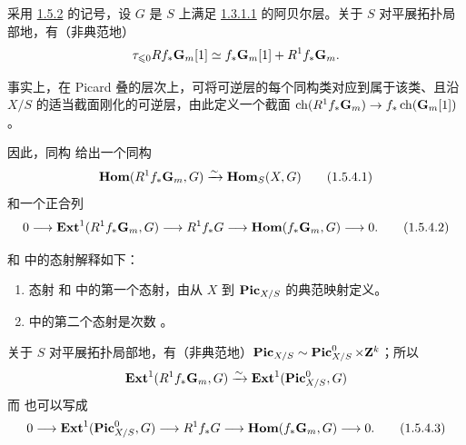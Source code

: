 \subsubsection{}
采用 \hyperref[XVIII.thm1.5.2]{1.5.2} 的记号，设 $G$ 是 $S$ 上满足 \hyperref[XVIII.par1.3.1.1]{1.3.1.1} 的阿贝尔层。关于 $S$ 对平展拓扑局部地，有（非典范地）
$$
\tau_{\leqslant 0}
Rf_{\ast}\mathbf{G}_{m}[1]\simeq
f_{\ast}\mathbf{G}_{m}[1]+R^{1}f_{\ast}\mathbf{G}_{m}{}.
$$

事实上，在 Picard 叠的层次上，可将可逆层的每个同构类对应到属于该类、且沿 $X/S$ 的适当截面刚化的可逆层，由此定义一个截面 $\operatorname{ch}(R^{1}f_{\ast}\mathbf{G}_{m})\rightarrow f_{\ast}\operatorname{ch}(\mathbf{G}_{m}[1])$。

因此，同构  给出一个同构
\begin{equation*}
\operatorname{\mathbf{Hom}}(R^{1}f_{\ast}\mathbf{G}_{m},G)\xrightarrow{\sim}\operatorname{\mathbf{Hom}}_{S}(X,G){}\tag{1.5.4.1}
\end{equation*}%
和一个正合列
\begin{equation*}
0\longrightarrow
\operatorname{\mathbf{Ext}}^{1}(R^{1}f_{\ast}\mathbf{G}_{m},G)\longrightarrow
R^1f_{\ast}G\longrightarrow
\operatorname{\mathbf{Hom}}(f_{\ast}\mathbf{G}_{m},G)\longrightarrow 0{}.\tag{1.5.4.2}
\end{equation*}

 和  中的态射解释如下：
\begin{enumerate}
\renewcommand{\theenumi}{\alph{enumi}}
\renewcommand{\labelenumi}{\theenumi)}
\item 态射\pageoriginale {} 和  中的第一个态射，由从 $X$ 到 $\operatorname{\mathbf{Pic}}_{X/S}$ 的典范映射定义。

\item {} 中的第二个态射是次数 。
\end{enumerate}

关于 $S$ 对平展拓扑局部地，有（非典范地）$\operatorname{\mathbf{Pic}}_{X/S}\sim \operatorname{\mathbf{Pic}}^{0}_{X/S}\times \mathbf{Z}^{k}$；所以
$$
\operatorname{\mathbf{Ext}}^{1}(R^{1}f_{\ast}\mathbf{G}_{m},G)\xrightarrow{\sim}\operatorname{\mathbf{Ext}}^{1}(\operatorname{\mathbf{Pic}}^{0}_{X/S}, G)
$$
而  也可以写成
\begin{equation*}
0 \longrightarrow \operatorname{\mathbf{Ext}}^{1}(\operatorname{\mathbf{Pic}}^{0}_{X/S},G)\longrightarrow
R^{1}f_{\ast}G\longrightarrow
\operatorname{\mathbf{Hom}}(f_{\ast}\mathbf{G}_{m},G)\longrightarrow 0{}.\tag{1.5.4.3}
\end{equation*}

